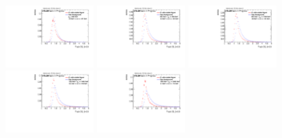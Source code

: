 \begin{figure}
\bigskip
\includegraphics[width=0.3\textwidth]{sascha_input/Appendix/Distributions/higgs/distributions/beta05/h_normal_tj_D2_05_bin1.pdf} 	\hspace{1mm}
\includegraphics[width=0.3\textwidth]{sascha_input/Appendix/Distributions/higgs/distributions/beta05/h_normal_tj_D2_05_bin2.pdf} 	\hspace{4mm}
\includegraphics[width=0.3\textwidth]{sascha_input/Appendix/Distributions/higgs/distributions/beta05/h_normal_tj_D2_05_bin3.pdf} 
\bigskip
\includegraphics[width=0.3\textwidth]{sascha_input/Appendix/Distributions/higgs/distributions/beta05/h_normal_tj_D2_05_bin4.pdf} 	\hspace{4mm}
\includegraphics[width=0.3\textwidth]{sascha_input/Appendix/Distributions/higgs/distributions/beta05/h_normal_tj_D2_05_bin5.pdf} 


\end{figure}
